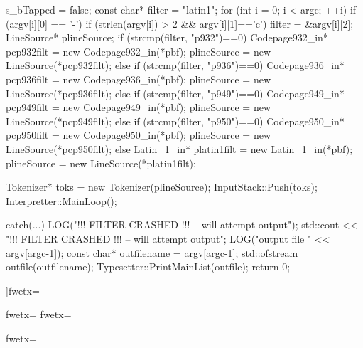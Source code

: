 {{{{{{{{{{{{{{      s_bTapped = false;
      const char* filter = "latin1";
      for (int i = 0; i < argc; ++i){
         if (argv[i][0] == '-'){
            if (strlen(argv[i]) > 2 && argv[i][1]=='c'){
              filter = &argv[i][2];
            }
         }
      }
      LineSource* plineSource;
      if (strcmp(filter, "p932")==0){
         Codepage932_in*  pcp932filt = new Codepage932_in(*pbf);
         plineSource = new LineSource(*pcp932filt);
      }else if (strcmp(filter, "p936")==0){
         Codepage936_in*  pcp936filt = new Codepage936_in(*pbf);
         plineSource = new LineSource(*pcp936filt);
      }else if (strcmp(filter, "p949")==0){
         Codepage949_in*  pcp949filt = new Codepage949_in(*pbf);
         plineSource = new LineSource(*pcp949filt);
      }else if (strcmp(filter, "p950")==0){
         Codepage950_in*  pcp950filt = new Codepage950_in(*pbf);
         plineSource = new LineSource(*pcp950filt);
      }else{
         Latin_1_in* platin1filt = new Latin_1_in(*pbf);
         plineSource = new LineSource(*platin1filt);
      }

      Tokenizer* toks = new Tokenizer(plineSource);
      InputStack::Push(toks);
      Interpretter::MainLoop();
   }
   catch(...){
      LOG("\n!!! FILTER CRASHED !!! -- will attempt output");
      std::cout << "\n!!! FILTER CRASHED !!! -- will attempt output";
   }
   LOG("\nWriting output file " << argv[argc-1]);
   const char* outfilename = argv[argc-1];
   std::ofstream outfile(outfilename);
   Typesetter::PrintMainList(outfile);
   return 0;
}

]fwetx=%
\fwcdef 
\fwbeginmacronotes
{}
\fwendmacronotes
\fwendmacro




\fwbeginmacro
{}\fwequals \fwodef \fwcdef 
\fwbeginmacronotes
{}
\fwendmacronotes
\fwendmacro


\fwbeginmacro
{}\fwequals \fwodef {}\fwbtx[
]fwetx=%
\fwbtx[
]fwetx=%
\fwcdef 
\fwbeginmacronotes
{}
\fwendmacronotes
\fwendmacro



\fwbeginmacro
{}\fwequals \fwodef {}fwetx=%
\fwcdef 
\fwbeginmacronotes
{}
\fwendmacronotes
\fwendmacro


}}}}}}}}}}}}
